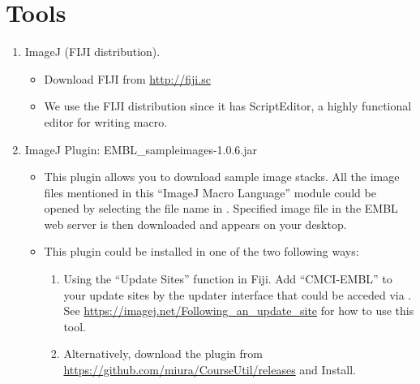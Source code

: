 \section{Tools}
\label{sec:tools}

\begin{enumerate}
  \item ImageJ (FIJI distribution).

\begin{itemize}
    \item Download FIJI from \url{http://fiji.sc}
    \item We use the FIJI distribution since it has ScriptEditor, a highly functional editor for writing macro. 
  
\end{itemize}
  \item ImageJ Plugin: EMBL\_sampleimages-1.0.6.jar

\begin{itemize}
     \item This plugin allows you to download sample image stacks. All the image files mentioned in this ``ImageJ Macro Language'' module could be opened by selecting the file name in . Specified image file in the EMBL web server is then downloaded and appears on your desktop.
    \item This plugin could be installed in one of the two following ways:
    \begin{enumerate}
    \item Using the ``Update Sites'' function in Fiji. Add ``CMCI-EMBL'' to your update sites by the updater interface that could be acceded via . See \url{https://imagej.net/Following_an_update_site} for how to use this tool.         
    \item Alternatively, download the plugin from \url{https://github.com/miura/CourseUtil/releases} and Install. 
    \end{enumerate}
\end{itemize}

\end{enumerate}
 
\newpage